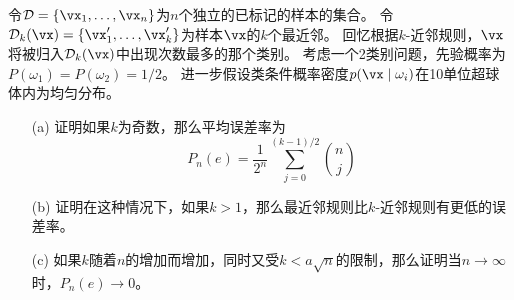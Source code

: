 \documentclass[reportComp]{thesis}
\begin{document}
\begin{question}[\textsection 4 Q6]
令$\mathcal{D}=\{\vx_1,\ldots,\vx_n\}$为$n$个独立的已标记的样本的集合。
令$\mathcal{D}_k(\vx)=\{\vx_1',\ldots,\vx_k'\}$为样本$\vx$的$k$个最近邻。
回忆根据$k$-近邻规则，$\vx$将被归入$\mathcal{D}_k(\vx)$中出现次数最多的那个类别。
考虑一个2类别问题，先验概率为$P(\omega_1)=P(\omega_2)=1/2$。
进一步假设类条件概率密度$p(\vx\mid\omega_i)$在10单位超球体内为均匀分布。
\begin{itemize}
	\item[(a)] 证明如果$k$为奇数，那么平均误差率为
	\[P_n(e)=\frac{1}{2^n}\sum_{j=0}^{(k-1)/2}\binom{n}{j}\]
	\item[(b)] 证明在这种情况下，如果$k>1$，那么最近邻规则比$k$-近邻规则有更低的误差率。
	\item[(c)] 如果$k$随着$n$的增加而增加，同时又受$k<a\sqrt{n}$的限制，那么证明当$n\to\infty$时，$P_n(e)\to 0$。
\end{itemize}
\end{question}
\end{document}

